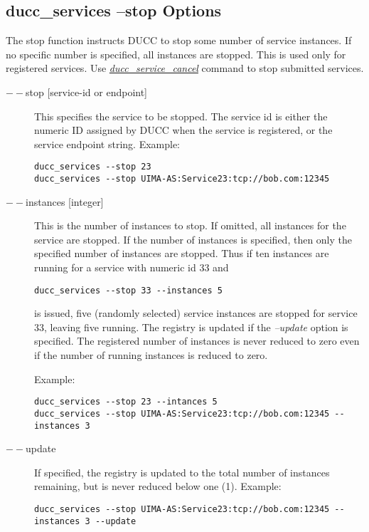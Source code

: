     \subsection{ducc\_services --stop Options}
    The stop function instructs DUCC to stop some number of service instances. If no specific number
    is specified, all instances are stopped. This is used only for registered services. Use
    \hyperref[sec:cli.service-cancel]{{\em ducc\_service\_cancel}} command to stop submitted services.

    \begin{description}

  \item[$--$stop {[service-id or endpoint]}] This specifies the service to be stopped. The service id
         is either the numeric ID assigned by DUCC when the service is registered, or the service
         endpoint string. Example:
\begin{verbatim}
ducc_services --stop 23 
ducc_services --stop UIMA-AS:Service23:tcp://bob.com:12345 
\end{verbatim}
         
       \item[$--$instances {[integer]}] This is the number of instances to stop. If omitted, all
         instances for the service are stopped.  If the number of instances is specified, then only
         the specified number of instances are stopped. Thus if ten instances are running for a
         service with numeric id 33 and
\begin{verbatim}
ducc_services --stop 33 --instances 5
\end{verbatim}
         is issued, five (randomly selected) service instances are stopped for
         service 33, leaving five running.  The registry is updated if the {\em --update} option is
         specified. The registered number of instances is never reduced to zero even if the number of
         running instances is reduced to zero.

         Example: 
\begin{verbatim}
ducc_services --stop 23 --intances 5 
ducc_services --stop UIMA-AS:Service23:tcp://bob.com:12345 --instances 3  
\end{verbatim}

       \item[$--$update] If specified, the registry is updated to the total number of instances
         remaining, but is never reduced below one (1). Example: 
\begin{verbatim}
ducc_services --stop UIMA-AS:Service23:tcp://bob.com:12345 --instances 3 --update
\end{verbatim}

    \end{description}

